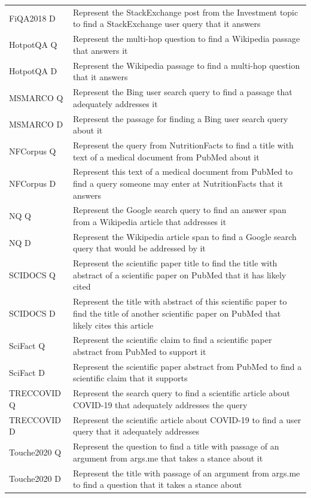 \documentclass{article}
\begin{document}
\begin{longtable}{lp{9cm}}
FiQA2018 D & Represent the StackExchange post from the Investment topic to find a StackExchange user query that it answers \\
HotpotQA Q & Represent the multi-hop question to find a Wikipedia passage that answers it \\
HotpotQA D & Represent the Wikipedia passage to find a multi-hop question that it answers \\
MSMARCO Q & Represent the Bing user search query to find a passage that adequately addresses it \\
MSMARCO D & Represent the passage for finding a Bing user search query about it \\
NFCorpus Q & Represent the query from NutritionFacts to find a title with text of a medical document from PubMed about it \\
NFCorpus D & Represent this text of a medical document from PubMed to find a query someone may enter at NutritionFacts that it answers \\
NQ Q & Represent the Google search query to find an answer span from a Wikipedia article that addresses it \\
NQ D & Represent the Wikipedia article span to find a Google search query that would be addressed by it \\
SCIDOCS Q & Represent the scientific paper title to find the title with abstract of a scientific paper on PubMed that it has likely cited \\
SCIDOCS D & Represent the title with abstract of this scientific paper to find the title of another scientific paper on PubMed that likely cites this article \\
SciFact Q & Represent the scientific claim to find a scientific paper abstract from PubMed to support it \\
SciFact D & Represent the scientific paper abstract from PubMed to find a scientific claim that it supports \\
TRECCOVID Q & Represent the search query to find a scientific article about COVID-19 that adequately addresses the query \\
TRECCOVID D & Represent the scientific article about COVID-19 to find a user query that it adequately addresses \\
Touche2020 Q & Represent the question to find a title with passage of an argument from args.me that takes a stance about it \\
Touche2020 D & Represent the title with passage of an argument from args.me to find a question that it takes a stance about \\

\end{longtable}
\end{document}
